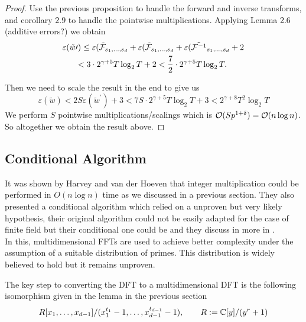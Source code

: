 \begin{proof}
    Use the previous proposition to handle the forward and inverse transforms, and corollary $2.9$ to handle the pointwise multiplications. Applying Lemma 2.6 (additive errors?) we obtain
    \begin{align*}
        \varepsilon(\tilde{w}&\prime) \leq \varepsilon(\tilde{\mathcal F}_{s_1, \ldots, s_d} + \varepsilon(\tilde{\mathcal F}_{s_1, \ldots, s_d} + \varepsilon(\tilde{\mathcal F^{-1}}_{s_1, \ldots, s_d} + 2\\
                             &< 3 \cdot 2^{\gamma + 5}T\log_2 T + 2 < \frac{7}{2} \cdot 2^{\gamma + 5}T \log_2 T.
    \end{align*}

    Then we need to scale the result in the end to give us
    \[
        \varepsilon(\tilde{w}) < 2S\varepsilon(\tilde{w}^\prime) + 3 < 7S \cdot 2^{\gamma + 5} T \log_2 T + 3 < 2^{\gamma + 8}T^2 \log_2 T
    \]
    We perform $S$ pointwise multiplications/scalings which is $\mathcal O(Sp^{1 + \delta}) = \mathcal O(n \log n)$. So altogether we obtain the result above.
\end{proof}


\subsection{Conditional Algorithm}

It was shown by Harvey and van der Hoeven \cite{nlogn} that integer multiplication could be performed in $O(n\log n)$ time as we discussed in a previous section. They also presented a conditional algorithm which relied on a unproven but very likely hypothesis, their original algorithm could not be easily adapted for the case of finite field but their conditional one could be and they discuss in more in \cite{ffnlogn}.\\
In this, multidimensional FFTs are used to achieve better complexity under the assumption of a suitable distribution of primes. This distribution is widely believed to hold but it remains unproven.

The key step to converting the DFT to a multidimensional DFT is the following isomorphism given in the lemma in the previous section
\begin{equation}\label{eq:here}
    R[x_1, \ldots, x_{d-1}] / (x_1^{t_1} - 1, \ldots, x_{d-1}^{t_{d-1}} - 1), \qquad R := {\mathbb C}[y]/(y^r + 1)
\end{equation}

